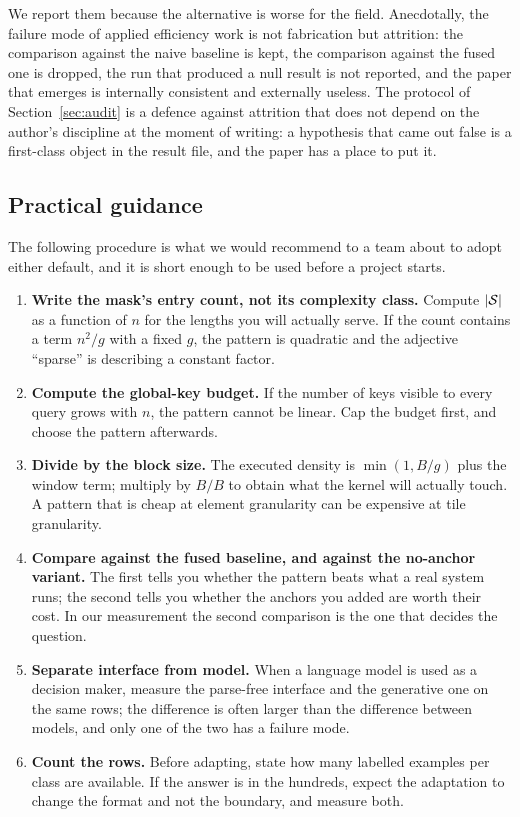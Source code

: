 We report them because the alternative is worse for the field. Anecdotally, the
failure mode of applied efficiency work is not fabrication but attrition: the
comparison against the naive baseline is kept, the comparison against the fused one
is dropped, the run that produced a null result is not reported, and the paper that
emerges is internally consistent and externally useless. The protocol of
Section~\ref{sec:audit} is a defence against attrition that does not depend on the
author's discipline at the moment of writing: a hypothesis that came out false is a
first-class object in the result file, and the paper has a place to put it.

\subsection{Practical guidance}\label{sec:guidance}

The following procedure is what we would recommend to a team about to adopt either
default, and it is short enough to be used before a project starts.

\begin{enumerate}\itemsep2pt
\item \textbf{Write the mask's entry count, not its complexity class.} Compute
$\lvert\mathcal{S}\rvert$ as a function of $n$ for the lengths you will actually serve.
If the count contains a term $n^2/g$ with a fixed $g$, the pattern is quadratic and
the adjective ``sparse'' is describing a constant factor.
\item \textbf{Compute the global-key budget.} If the number of keys visible to
every query grows with $n$, the pattern cannot be linear. Cap the budget first, and
choose the pattern afterwards.
\item \textbf{Divide by the block size.} The executed density is
$\min(1,B/g)$ plus the window term; multiply by $B/B$ to obtain what the kernel
will actually touch. A pattern that is cheap at element granularity can be
expensive at tile granularity.
\item \textbf{Compare against the fused baseline, and against the no-anchor
variant.} The first tells you whether the pattern beats what a real system runs;
the second tells you whether the anchors you added are worth their cost. In our
measurement the second comparison is the one that decides the question.
\item \textbf{Separate interface from model.} When a language model is used as a
decision maker, measure the parse-free interface and the generative one on the same
rows; the difference is often larger than the difference between models, and only
one of the two has a failure mode.
\item \textbf{Count the rows.} Before adapting, state how many labelled examples
per class are available. If the answer is in the hundreds, expect the adaptation to
change the format and not the boundary, and measure both.
\end{enumerate}

